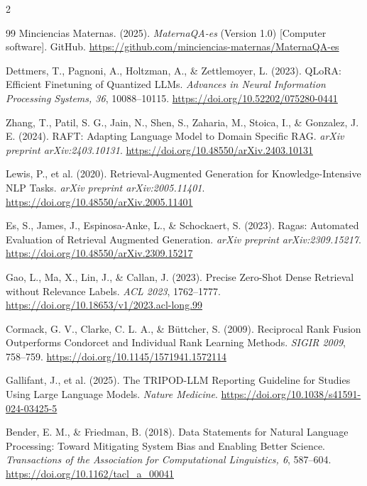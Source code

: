 \documentclass[11pt]{article}
\begin{document}
\begin{multicols}{2}
\begin{thebibliography}{99}
     Minciencias Maternas. (2025). \textit{MaternaQA-es} (Version 1.0) [Computer software]. GitHub. \url{https://github.com/minciencias-maternas/MaternaQA-es}

     Dettmers, T., Pagnoni, A., Holtzman, A., \& Zettlemoyer, L. (2023). QLoRA: Efficient Finetuning of Quantized LLMs. \textit{Advances in Neural Information Processing Systems, 36}, 10088--10115. \url{https://doi.org/10.52202/075280-0441}

     Zhang, T., Patil, S. G., Jain, N., Shen, S., Zaharia, M., Stoica, I., \& Gonzalez, J. E. (2024). RAFT: Adapting Language Model to Domain Specific RAG. \textit{arXiv preprint arXiv:2403.10131}. \url{https://doi.org/10.48550/arXiv.2403.10131}

     Lewis, P., et al. (2020). Retrieval-Augmented Generation for Knowledge-Intensive NLP Tasks. \textit{arXiv preprint arXiv:2005.11401}. \url{https://doi.org/10.48550/arXiv.2005.11401}

     Es, S., James, J., Espinosa-Anke, L., \& Schockaert, S. (2023). Ragas: Automated Evaluation of Retrieval Augmented Generation. \textit{arXiv preprint arXiv:2309.15217}. \url{https://doi.org/10.48550/arXiv.2309.15217}

     Gao, L., Ma, X., Lin, J., \& Callan, J. (2023). Precise Zero-Shot Dense Retrieval without Relevance Labels. \textit{ACL 2023}, 1762--1777. \url{https://doi.org/10.18653/v1/2023.acl-long.99}

     Cormack, G. V., Clarke, C. L. A., \& B{\"u}ttcher, S. (2009). Reciprocal Rank Fusion Outperforms Condorcet and Individual Rank Learning Methods. \textit{SIGIR 2009}, 758--759. \url{https://doi.org/10.1145/1571941.1572114}

     Gallifant, J., et al. (2025). The TRIPOD-LLM Reporting Guideline for Studies Using Large Language Models. \textit{Nature Medicine}. \url{https://doi.org/10.1038/s41591-024-03425-5}

     Bender, E. M., \& Friedman, B. (2018). Data Statements for Natural Language Processing: Toward Mitigating System Bias and Enabling Better Science. \textit{Transactions of the Association for Computational Linguistics, 6}, 587--604. \url{https://doi.org/10.1162/tacl_a_00041}
\end{thebibliography}
\end{multicols}
\end{document}
